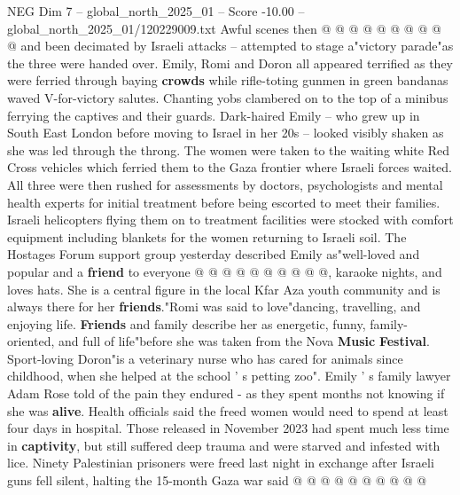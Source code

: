 \begin{textsample}{NEG Dim 7 – global\_north\_2025\_01 – Score -10.00 – global\_north\_2025\_01/120229009.txt}
Awful scenes then @ @ @ @ @ @ @ @ @ @ and been decimated by Israeli attacks -- attempted to stage a"victory parade"as the three were handed over.
Emily, Romi and Doron all appeared terrified as they were ferried through baying \textbf{crowds} while rifle-toting gunmen in green bandanas waved V-for-victory salutes.
Chanting yobs clambered on to the top of a minibus ferrying the captives and their guards.
Dark-haired Emily -- who grew up in South East London before moving to Israel in her 20s -- looked visibly shaken as she was led through the throng.
The women were taken to the waiting white Red Cross vehicles which ferried them to the Gaza frontier where Israeli forces waited.
All three were then rushed for assessments by doctors, psychologists and mental health experts for initial treatment before being escorted to meet their families.
Israeli helicopters flying them on to treatment facilities were stocked with comfort equipment including blankets for the women returning to Israeli soil.
The Hostages Forum support group yesterday described Emily as"well-loved and popular and a \textbf{friend} to everyone @ @ @ @ @ @ @ @ @ @, karaoke nights, and loves hats.
She is a central figure in the local Kfar Aza youth community and is always there for her \textbf{friends}."Romi was said to love"dancing, travelling, and enjoying life. \textbf{Friends} and family describe her as energetic, funny, family-oriented, and full of life"before she was taken from the Nova \textbf{Music} \textbf{Festival}.
Sport-loving Doron"is a veterinary nurse who has cared for animals since childhood, when she helped at the school ' s petting zoo".
Emily ' s family lawyer Adam Rose told of the pain they endured - as they spent months not knowing if she was \textbf{alive}.
Health officials said the freed women would need to spend at least four days in hospital.
Those released in November 2023 had spent much less time in \textbf{captivity}, but still suffered deep trauma and were starved and infested with lice.
Ninety Palestinian prisoners were freed last night in exchange after Israeli guns fell silent, halting the 15-month Gaza war said @ @ @ @ @ @ @ @ @ @

\end{textsample}
